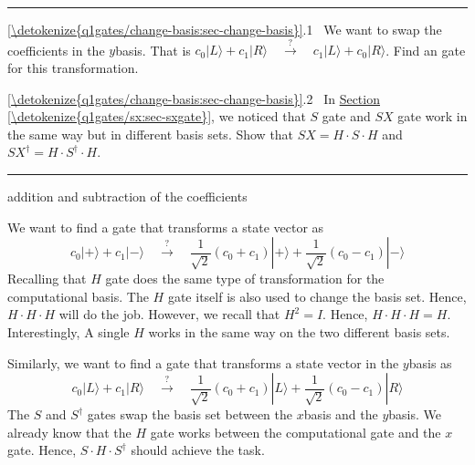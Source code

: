 \documentclass[letterpaper,10pt,english]{jupyterBook}
\begin{document}
\bigskip\hrule\bigskip


\sphinxAtStartPar
{} \hyperref[\detokenize{q1gates/change-basis:sec-change-basis}]{\ref{\detokenize{q1gates/change-basis:sec-change-basis}}}.1   We want to swap the coefficients in the \(y\)\sphinxhyphen{}basis.  That is \(
c_0 |L\rangle + c_1 |R\rangle \quad \xrightarrow{?} \quad c_1 |L\rangle + c_0 |R\rangle \). Find an gate for this transformation.

\sphinxAtStartPar
{} \hyperref[\detokenize{q1gates/change-basis:sec-change-basis}]{\ref{\detokenize{q1gates/change-basis:sec-change-basis}}}.2   In \hyperref[\detokenize{q1gates/sx:sec-sxgate}]{Section \ref{\detokenize{q1gates/sx:sec-sxgate}}}, we noticed that \(S\) gate and \(SX\) gate work in the same way but in different basis sets.  Show that \(SX = H \cdot S \cdot H\) and \(SX^\dagger = H \cdot S^\dagger \cdot H\).


\bigskip\hrule\bigskip


\sphinxAtStartPar
{} addition and subtraction of the coefficients

\sphinxAtStartPar
We want to find a gate that transforms a state vector as
\begin{equation*}
c_0 |+\rangle + c_1|-\rangle \quad \xrightarrow{?} \quad \frac{1}{\sqrt{2}}\left(c_0+c_1\right)|+\rangle + \frac{1}{\sqrt{2}}\left(c_0-c_1\right)|-\rangle
\end{equation*}
\sphinxAtStartPar
Recalling that \(H\) gate does the same type of transformation for the computational basis.  The \(H\) gate itself is also used to change the basis set. Hence, \(H \cdot H \cdot H\) will do the job. However, we recall that \(H^2=I\).  Hence, \(H \cdot H \cdot H=H\).  Interestingly, A single \(H\) works in the same way on the two different basis sets.

\sphinxAtStartPar
Similarly, we want to find a gate that transforms a state vector in the \(y\)\sphinxhyphen{}basis as
\begin{equation*}
c_0 |L\rangle + c_1|R\rangle \quad \xrightarrow{?} \quad \frac{1}{\sqrt{2}}\left(c_0+c_1\right)|L\rangle + \frac{1}{\sqrt{2}}\left(c_0-c_1\right)|R\rangle
\end{equation*}
\sphinxAtStartPar
The \(S\) and \(S^\dagger\) gates swap the basis set between the \(x\)\sphinxhyphen{}basis and the \(y\)\sphinxhyphen{}basis. We already know that the \(H\) gate works between the computational gate and the \(x\) gate.  Hence, \(S \cdot H \cdot S^\dagger\) should achieve the task.
\end{document}
